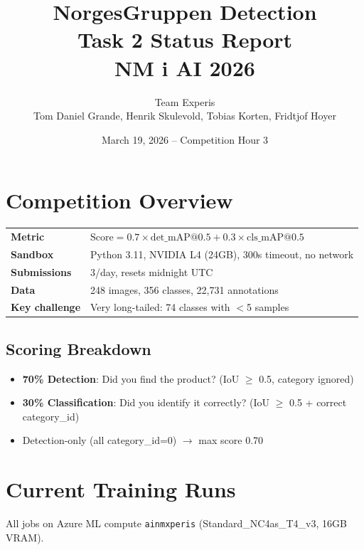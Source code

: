 \documentclass[11pt,a4paper]{article}
\title{\textbf{NorgesGruppen Detection} \\ \large Task 2 Status Report \\ NM i AI 2026}
\author{Team Experis \\ Tom Daniel Grande, Henrik Skulevold, Tobias Korten, Fridtjof Hoyer}
\date{March 19, 2026 -- Competition Hour 3}
\begin{document}
\maketitle
\tableofcontents
\newpage

\section{Competition Overview}

\begin{tabular}{@{}ll@{}}
\toprule
\textbf{Metric} & $\text{Score} = 0.7 \times \text{det\_mAP@0.5} + 0.3 \times \text{cls\_mAP@0.5}$ \\
\textbf{Sandbox} & Python 3.11, NVIDIA L4 (24GB), 300s timeout, no network \\
\textbf{Submissions} & 3/day, resets midnight UTC \\
\textbf{Data} & 248 images, 356 classes, 22,731 annotations \\
\textbf{Key challenge} & Very long-tailed: 74 classes with $<$5 samples \\
\bottomrule
\end{tabular}

\subsection{Scoring Breakdown}
\begin{itemize}[nosep]
  \item \textbf{70\% Detection}: Did you find the product? (IoU $\geq$ 0.5, category ignored)
  \item \textbf{30\% Classification}: Did you identify it correctly? (IoU $\geq$ 0.5 + correct category\_id)
  \item Detection-only (all category\_id=0) $\rightarrow$ max score 0.70
\end{itemize}

\section{Current Training Runs}

All jobs on Azure ML compute \texttt{ainmxperis} (Standard\_NC4as\_T4\_v3, 16GB VRAM).
\end{document}
